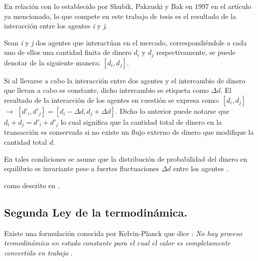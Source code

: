 En relación con lo establecido por Shubik, Pakzuski y Bak en 1997 en el artículo ya mencionado, lo que compete en este trabajo de tesis es el resultado de la interacción entre los agentes \textit{i} y \textit{j}. 

Sean \textit{i} y \textit{j} dos agentes que interactúan en el mercado, correspondiéndole a cada uno de ellos una cantidad finita de dinero $d_{i}$ y $d_{j}$ respectivamente, se puede denotar de la siguiente manera: $[d_{i},d_{j}]$. 

Si al llevarse a cabo la interacción entre dos agentes y el intercambio de dinero que llevan a cabo es constante, dicho intercambio se etiqueta como $\Delta d$. El resultado de la interacción de los agentes en cuestión se expresa como:  $[d_{i},d_{j}]$ $\longrightarrow$  $[d'_{i},d'_{j}] = [d_{i} - \Delta d ,d_{j} + \Delta d]$. Dicho lo anterior puede notarse que $d_{i} + d_{j} = d'_{i} + d'_{j}$ lo cual significa que la cantidad total de dinero en la transacción es conservada si no existe un flujo externo de dinero que modifique la cantidad total $d$.

En tales condiciones se asume que la distribución de probabilidad del dinero en equilibrio es invariante pese a fuertes fluctuaciones $\Delta d$ entre los agentes \citep[][pagina 149]{cottrell_classical_2009}.



como descrito en \citep{Huang2021}.



\subsection{Segunda Ley de la termodinámica.} 


%



Existe una formulación conocida por Kelvin-Planck que dice : \textit{No hay proceso termodinámico en estado constante para el cual el calor es completamente convertido en trabajo} \citep[][pagina 86]{struchtrup}.

